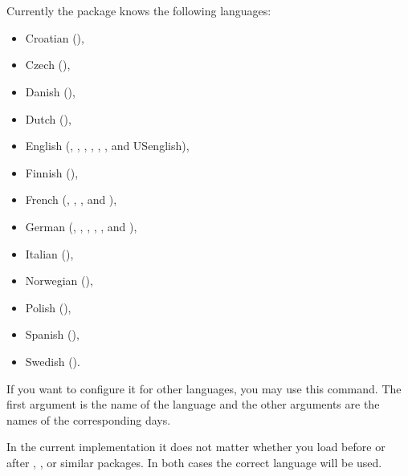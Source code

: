 \begin{Declaration}
  \\
  \\
\end{Declaration}
Currently the package  knows the following languages:
\begin{itemize}
\item Croatian (),
\item Czech (),
\item Danish (),
\item Dutch (),
\item English (,
  , , , ,
  , and USenglish),
\item Finnish (),
\item French (, ,
  , and ),
\item German (,
  , , ,
  , and
  ),
\item Italian (),
\item Norwegian (),
\item Polish (),
\item Spanish (),
\item Swedish ().
\end{itemize}
If you want to configure it for other languages, you may use this command. The
first argument is the name of the language and the other arguments are the
names of the corresponding days.

In the current implementation it does not matter whether you load
 before or after
,
,
 or similar packages. In both cases the
correct language will be used.

